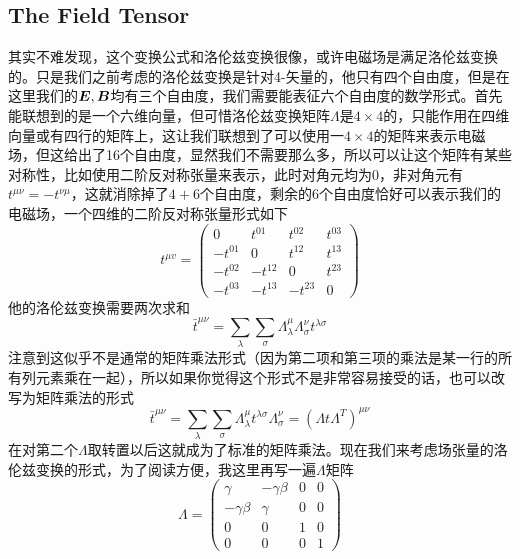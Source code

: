 \documentclass[14pt,oneside]{book}
\def \E{\vb*{E}}
\def \B{\vb*{B}}
\begin{document}
\begin{large}
\subsection{The Field Tensor}
其实不难发现，这个变换公式和洛伦兹变换很像，或许电磁场是满足洛伦兹变换的。只是我们之前考虑的洛伦兹变换是针对4-矢量的，他只有四个自由度，但是在这里我们的$\E,\B$均有三个自由度，我们需要能表征六个自由度的数学形式。首先能联想到的是一个六维向量，但可惜洛伦兹变换矩阵$\Lambda$是$4\times 4$的，只能作用在四维向量或有四行的矩阵上，这让我们联想到了可以使用一$4\times 4$的矩阵来表示电磁场，但这给出了16个自由度，显然我们不需要那么多，所以可以让这个矩阵有某些对称性，比如使用二阶反对称张量来表示，此时对角元均为0，非对角元有$t^{\mu\nu}=-t^{\nu\mu}$，这就消除掉了${4+6}$个自由度，剩余的6个自由度恰好可以表示我们的电磁场，一个四维的二阶反对称张量形式如下
\begin{equation}
t^{\mu v}=\left(\begin{array}{cccc}
0 & t^{01} & t^{02} & t^{03} \\
-t^{01} & 0 & t^{12} & t^{13} \\
-t^{02} & -t^{12} & 0 & t^{23} \\
-t^{03} & -t^{13} & -t^{23} & 0
\end{array}\right)
\end{equation}
他的洛伦兹变换需要两次求和
\begin{equation}
  \bar t^{\mu\nu}=\sum_\lambda\sum_\sigma\Lambda^\mu_\lambda\Lambda^\nu_{\sigma} t^{\lambda\sigma}
\end{equation}
注意到这似乎不是通常的矩阵乘法形式（因为第二项和第三项的乘法是某一行的所有列元素乘在一起），所以如果你觉得这个形式不是非常容易接受的话，也可以改写为矩阵乘法的形式
\begin{equation}
  \bar t^{\mu\nu}=\sum_\lambda\sum_\sigma\Lambda^\mu_\lambda t^{\lambda\sigma}\Lambda^\nu_{\sigma} =(\Lambda t \Lambda^T)^{\mu\nu}
\end{equation}
在对第二个$\Lambda$取转置以后这就成为了标准的矩阵乘法。现在我们来考虑场张量的洛伦兹变换的形式，为了阅读方便，我这里再写一遍$\Lambda$矩阵
\begin{equation}
\Lambda=
\left(\begin{array}{cccc}
\gamma & -\gamma \beta & 0 & 0 \\
-\gamma \beta & \gamma & 0 & 0 \\
0 & 0 & 1 & 0 \\
0 & 0 & 0 & 1
\end{array}\right)
\end{equation}


\end{large}
\end{document}
